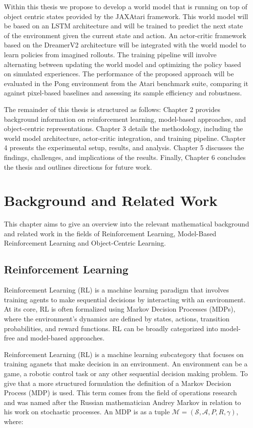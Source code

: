 \documentclass[
	english,
	ruledheaders=section,
	class=report,
	thesis={type=master},
	accentcolor=9c,
	custommargins=true,
	marginpar=false,
	parskip=half-,
	fontsize=11pt,
]{tudapub}
\begin{document}
Within this thesis we propose to develop a world model that is running on top
of object centric states provided by the JAXAtari framework. This world model
will be based on an LSTM architecture and will be trained to predict the next
state of the environment given the current state and action. An actor-critic
framework based on the DreamerV2 architecture will be integrated with the world
model to learn policies from imagined rollouts. The training pipeline will
involve alternating between updating the world model and optimizing the policy
based on simulated experiences. The performance of the proposed approach will
be evaluated in the Pong environment from the Atari benchmark suite, comparing
it against pixel-based baselines and assessing its sample efficiency and
robustness.

The remainder of this thesis is structured as follows: Chapter 2 provides
background information on reinforcement learning, model-based approaches, and
object-centric representations. Chapter 3 details the methodology, including
the world model architecture, actor-critic integration, and training pipeline.
Chapter 4 presents the experimental setup, results, and analysis. Chapter 5
discusses the findings, challenges, and implications of the results. Finally,
Chapter 6 concludes the thesis and outlines directions for future work.

\chapter{Background and Related Work}
\label{chap:background}
This chapter aims to give an overview into the relevant mathematical background and related work
in the fields of Reinforcement Learning, Model-Based Reinforcement Learning and Object-Centric Learning.
\section{Reinforcement Learning}
\label{sec:reinforcement_learning}

Reinforcement Learning (RL) is a machine learning paradigm that involves
training agents to make sequential decisions by interacting with an
environment. At its core, RL is often formalized using Markov Decision
Processes (MDPs), where the environment's dynamics are defined by states,
actions, transition probabilities, and reward functions. RL can be broadly
categorized into model-free and model-based approaches.

Reinforcement Learning (RL) is a machine learning subcategory that focuses on
training aganets that make decision in an environment. An environment can be a
game, a robotic control task or any other sequential decision making problem.
To give that a more structured formulation the definition of a Markov Decision
Process (MDP) is used. This term comes from the field of operations research
and was named after the Russian mathematician Andrey Markov in relation to his
work on stochastic processes. An MDP is as a tuple $\mathcal{M} = (\mathcal{S},
	\mathcal{A}, P, R, \gamma)$, where:
\end{document}
